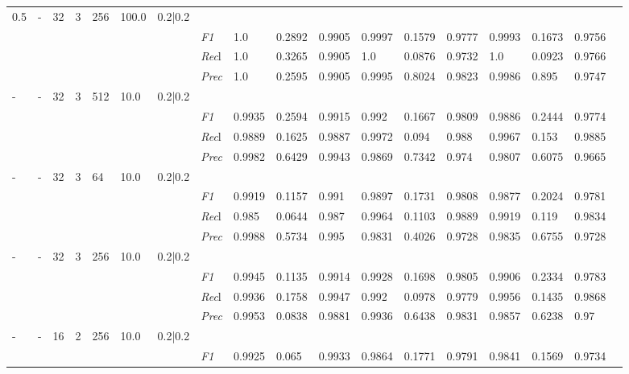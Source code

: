 \begin{table}[]
\begin{tabularx}{\textwidth}{XXXXXXX|X|XXX|XXX|XXXX}
0.5 & - & 32 & 3 & 256 &100.0 & 0.2|0.2 & & & & & & & & & \\
& & & & & & & \textit{F1} & 1.0 & 0.2892 & 0.9905 & 0.9997 & 0.1579        & 0.9777        & 0.9993        & 0.1673        & 0.9756        \\
& & & & & & & \textit{Rec}l & 1.0 & 0.3265 & 0.9905    & 1.0 & 0.0876    & 0.9732    & 1.0    & 0.0923    & 0.9766    \\
& & & & & & & \textit{Prec} & 1.0 & 0.2595 & 0.9905 & 0.9995 & 0.8024 & 0.9823 & 0.9986 & 0.895 & 0.9747 \\ \midrule
- & - & 32 & 3 & 512 &10.0 & 0.2|0.2 & & & & & & & & & \\
& & & & & & & \textit{F1} & 0.9935 & 0.2594 & 0.9915 & 0.992 & 0.1667        & 0.9809        & 0.9886        & 0.2444        & 0.9774        \\
& & & & & & & \textit{Rec}l & 0.9889 & 0.1625 & 0.9887    & 0.9972 & 0.094    & 0.988    & 0.9967    & 0.153    & 0.9885    \\
& & & & & & & \textit{Prec} & 0.9982 & 0.6429 & 0.9943 & 0.9869 & 0.7342 & 0.974 & 0.9807 & 0.6075 & 0.9665 \\ \midrule
- & - & 32 & 3 & 64 &10.0 & 0.2|0.2 & & & & & & & & & \\
& & & & & & & \textit{F1} & 0.9919 & 0.1157 & 0.991 & 0.9897 & 0.1731        & 0.9808        & 0.9877        & 0.2024        & 0.9781        \\
& & & & & & & \textit{Rec}l & 0.985 & 0.0644 & 0.987    & 0.9964 & 0.1103    & 0.9889    & 0.9919    & 0.119    & 0.9834    \\
& & & & & & & \textit{Prec} & 0.9988 & 0.5734 & 0.995 & 0.9831 & 0.4026 & 0.9728 & 0.9835 & 0.6755 & 0.9728 \\ \midrule
- & - & 32 & 3 & 256 &10.0 & 0.2|0.2 & & & & & & & & & \\
& & & & & & & \textit{F1} & 0.9945 & 0.1135 & 0.9914 & 0.9928 & 0.1698        & 0.9805        & 0.9906        & 0.2334        & 0.9783        \\
& & & & & & & \textit{Rec}l & 0.9936 & 0.1758 & 0.9947    & 0.992 & 0.0978    & 0.9779    & 0.9956    & 0.1435    & 0.9868    \\
& & & & & & & \textit{Prec} & 0.9953 & 0.0838 & 0.9881 & 0.9936 & 0.6438 & 0.9831 & 0.9857 & 0.6238 & 0.97 \\ \midrule
- & - & 16 & 2 & 256 &10.0 & 0.2|0.2 & & & & & & & & & \\
& & & & & & & \textit{F1} & 0.9925 & 0.065 & 0.9933 & 0.9864 & 0.1771        & 0.9791        & 0.9841        & 0.1569        & 0.9734        \\

\end{tabularx}
\end{table}

